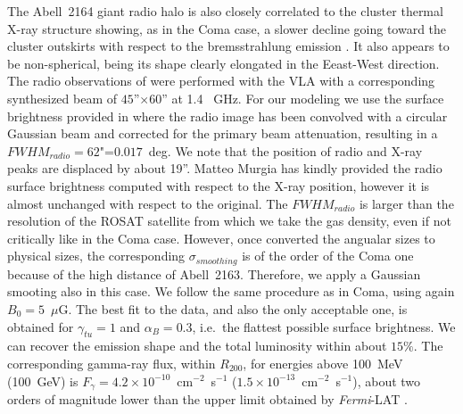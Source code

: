 \documentclass[traditabstract]{aa}
\begin{document}
The Abell~2164 giant radio halo is also closely correlated to the cluster thermal X-ray structure showing, as in the Coma case, a slower decline going toward the cluster outskirts with respect to the bremsstrahlung emission \citep{2001A&A...373..106F}. It also appears to be non-spherical, being its shape clearly elongated in the Eeast-West direction. The radio observations of \cite{2001A&A...373..106F} were performed with the VLA with a corresponding synthesized beam of $45$''$\times60$'' at 1.4 ~GHz. For our modeling we use the surface brightness provided in \cite{2009A&A...499..679M} where the radio image has been convolved with a circular Gaussian beam and corrected for the primary beam attenuation, resulting in a $FWHM_{radio}=62$"=$0.017$~deg. We note that the position of radio and X-ray peaks are displaced by about 19''. Matteo Murgia has kindly provided the radio surface brightness computed with respect to the \cite{2002ApJ...567..716R} X-ray position, however it is almost unchanged with respect to the original. The $FWHM_{radio}$ is larger than the resolution of the ROSAT satellite from which we take the gas density, even if not critically like in the Coma case. However, once converted the angualar sizes to physical sizes, the corresponding $\sigma_{smoothing}$ is of the order of the Coma one because of the high distance of Abell~2163. Therefore, we apply a Gaussian smooting also in this case. We follow the same procedure as in Coma, using again $B_{0}=5$~$\mu$G. The best fit to the data, and also the only acceptable one, is obtained for $\gamma_{tu}=1$ and $\alpha_B=0.3$, i.e.~the flattest possible surface brightness. We can recover the emission shape and the total luminosity within about $15\%$. The corresponding gamma-ray flux, within $R_{200}$, for energies above 100~MeV (100~GeV) is $F_{\gamma} = 4.2 \times 10^{-10}$~cm$^{-2}$~s$^{-1}$ ($1.5 \times 10^{-13}$~cm$^{-2}$~s$^{-1}$), about two orders of magnitude lower than the upper limit obtained by \emph{Fermi}-LAT \citep{2010ApJ...717L..71A}.
\end{document}
